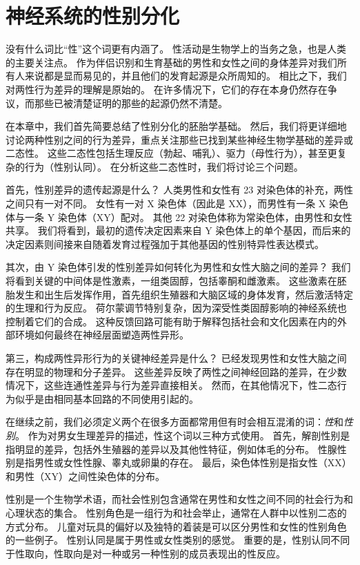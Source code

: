\chapter{神经系统的性别分化} \label{chap:chap51}

没有什么词比“性”这个词更有内涵了。
性活动是生物学上的当务之急，也是人类的主要关注点。
作为伴侣识别和生育基础的男性和女性之间的身体差异对我们所有人来说都是显而易见的，并且他们的发育起源是众所周知的。
相比之下，我们对两性行为差异的理解是原始的。
在许多情况下，它们的存在本身仍然存在争议，而那些已被清楚证明的那些的起源仍然不清楚。


在本章中，我们首先简要总结了性别分化的胚胎学基础。
然后，我们将更详细地讨论两种性别之间的行为差异，重点关注那些已找到某些神经生物学基础的差异或二态性。
这些二态性包括生理反应（勃起、哺乳）、驱力（母性行为），甚至更复杂的行为（性别认同）。
在分析这些二态性时，我们将讨论三个问题。


首先，性别差异的遗传起源是什么？
人类男性和女性有 23 对染色体的补充，两性之间只有一对不同。
女性有一对 X 染色体（因此是 XX），而男性有一条 X 染色体与一条 Y 染色体（XY）配对。
其他 22 对染色体称为常染色体，由男性和女性共享。
我们将看到，最初的遗传决定因素来自 Y 染色体上的单个基因，而后来的决定因素则间接来自随着发育过程强加于其他基因的性别特异性表达模式。


其次，由 Y 染色体引发的性别差异如何转化为男性和女性大脑之间的差异？
我们将看到关键的中间体是性激素，一组类固醇，包括睾酮和雌激素。
这些激素在胚胎发生和出生后发挥作用，首先组织生殖器和大脑区域的身体发育，然后激活特定的生理和行为反应。
荷尔蒙调节特别复杂，因为深受性类固醇影响的神经系统也控制着它们的合成。
这种反馈回路可能有助于解释包括社会和文化因素在内的外部环境如何最终在神经层面塑造两性异形。


第三，构成两性异形行为的关键神经差异是什么？
已经发现男性和女性大脑之间存在明显的物理和分子差异。
这些差异反映了两性之间神经回路的差异，在少数情况下，这些连通性差异与行为差异直接相关。
然而，在其他情况下，性二态行为似乎是由相同基本回路的不同使用引起的。


在继续之前，我们必须定义两个在很多方面都常用但有时会相互混淆的词：\textit{性}和\textit{性别}。
作为对男女生理差异的描述，性这个词以三种方式使用。
首先，解剖性别是指明显的差异，包括外生殖器的差异以及其他性特征，例如体毛的分布。
性腺性别是指男性或女性性腺、睾丸或卵巢的存在。
最后，染色体性别是指女性（XX）和男性（XY）之间性染色体的分布。


性别是一个生物学术语，而社会性别包含通常在男性和女性之间不同的社会行为和心理状态的集合。
性别角色是一组行为和社会举止，通常在人群中以性别二态的方式分布。
儿童对玩具的偏好以及独特的着装是可以区分男性和女性的性别角色的一些例子。
性别认同是属于男性或女性类别的感觉。
重要的是，性别认同不同于性取向，性取向是对一种或另一种性别的成员表现出的性反应。


